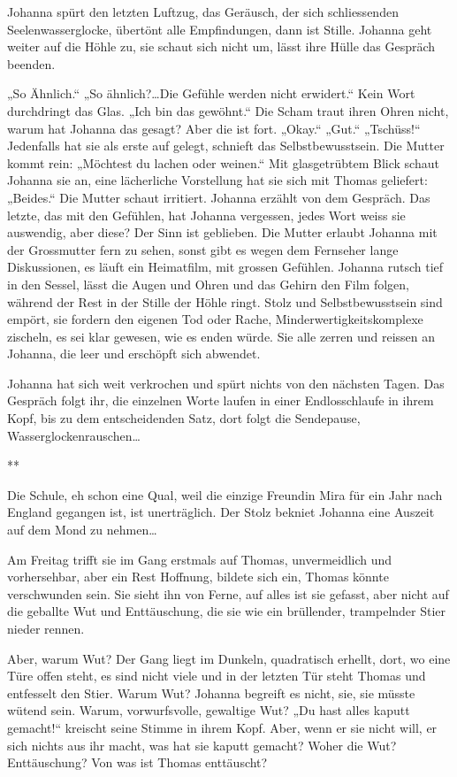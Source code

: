 \documentclass[10pt,titlepage,a5paper]{book}
\newcommand{\sterne}{\par{\centering ***\par}}
\begin{document}
Johanna spürt den letzten Luftzug, das Geräusch, der sich schliessenden Seelenwasserglocke, übertönt alle Empfindungen, dann ist Stille. Johanna geht weiter auf die Höhle zu, sie schaut sich nicht um, lässt ihre Hülle das Gespräch beenden.

„So Ähnlich.“ „So ähnlich?\dots  Die Gefühle werden nicht erwidert.“ 
Kein Wort durchdringt das Glas. „Ich bin das gewöhnt.“ Die Scham traut ihren Ohren nicht, warum hat Johanna das gesagt? Aber die ist fort. „Okay.“ „Gut.“ „Tschüss!“ Jedenfalls hat sie als erste auf gelegt, schnieft das Selbstbewusstsein.
Die Mutter kommt rein: „Möchtest du lachen oder weinen.“ Mit glasgetrübtem Blick schaut  Johanna sie an, eine lächerliche Vorstellung hat sie sich mit Thomas geliefert: „Beides.“ Die Mutter schaut irritiert. Johanna erzählt von dem Gespräch. Das letzte, das mit den Gefühlen, hat Johanna vergessen, jedes Wort weiss sie auswendig, aber diese? Der Sinn ist geblieben.
Die Mutter erlaubt Johanna mit der Grossmutter fern zu sehen, sonst gibt es wegen dem Fernseher lange Diskussionen, es läuft ein Heimatfilm, mit grossen Gefühlen. Johanna rutsch tief in den Sessel, lässt die Augen und Ohren und das Gehirn den Film folgen, während der Rest in der Stille  der Höhle ringt. Stolz und Selbstbewusstsein sind empört, sie fordern den eigenen Tod oder Rache, Minderwertigkeitskomplexe zischeln, es sei klar gewesen, wie es enden würde. Sie alle zerren und reissen an Johanna, die leer und erschöpft sich abwendet.

Johanna hat sich weit verkrochen und spürt nichts von den nächsten Tagen. Das Gespräch folgt ihr, die einzelnen Worte laufen in einer Endlosschlaufe in ihrem Kopf, bis zu dem entscheidenden Satz, dort folgt die Sendepause, Wasserglockenrauschen\dots 


\sterne


Die Schule, eh schon eine Qual, weil die einzige Freundin Mira für ein Jahr nach England gegangen ist, ist unerträglich. Der Stolz bekniet Johanna eine Auszeit auf dem Mond zu nehmen\dots 

Am Freitag trifft sie im Gang erstmals auf Thomas, unvermeidlich und vorhersehbar, aber ein Rest Hoffnung, bildete sich ein, Thomas könnte verschwunden sein. Sie sieht ihn von Ferne, auf alles ist sie gefasst, aber nicht auf die geballte Wut und Enttäuschung, die sie wie ein brüllender, trampelnder Stier nieder rennen. 

Aber, warum Wut? Der Gang liegt im Dunkeln, quadratisch erhellt, dort, wo eine Türe offen steht, es  sind nicht viele und in der letzten Tür steht Thomas und entfesselt den Stier. Warum Wut? Johanna begreift es nicht, sie, sie müsste wütend sein. Warum, vorwurfsvolle, gewaltige Wut? „Du hast alles kaputt gemacht!“ kreischt seine Stimme in ihrem Kopf. Aber, wenn er sie nicht will, er sich nichts aus ihr macht, was hat sie kaputt gemacht? Woher die Wut? Enttäuschung? Von was ist Thomas enttäuscht?
\end{document}
